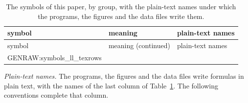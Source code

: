 {\small\longtabledepth
\begin{longtable}{p{}p{}>{\raggedright\arraybackslash\footnotesize}p{}}
\caption{The symbols of this paper, by group, with the plain-text names under which the programs, the
figures and the data files write them.}\label{tab:symbols}\\
\toprule
symbol & meaning & plain-text names\\
\midrule
\endfirsthead
\toprule
symbol & meaning (continued) & plain-text names\\
\midrule
\endhead
\bottomrule
\endfoot
{{GENRAW:symbols_ll_texrows}}
\end{longtable}
}\longtabledepthrestore

\emph{Plain-text names.} The programs, the figures and the data files write formulas in plain text,
with the names of the last column of Table~\ref{tab:symbols}. The following conventions complete
that column.
